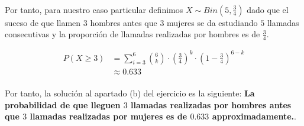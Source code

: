 \documentclass[a4paper, spanish]{article}
\begin{document}
    \paragraph{}
    Por tanto, para nuestro caso particular definimos $X \sim Bin\left(5, \frac{3}{4}\right)$ dado que el suceso de que llamen $3$ hombres antes que $3$ mujeres se da estudiando $5$ llamadas consecutivas y la proporción de llamadas realizadas por hombres es de $\frac{3}{4}$.

    \begin{align*}
      P(X \geq 3)
      &= \sum_{i = 3}^6 \binom{6}{k} \cdot \left(\frac{3}{4} \right)^k \cdot \left(1 - \frac{3}{4}\right) ^ {6 - k} \\
      &\approx 0.633
    \end{align*}

    \paragraph{}
    Por tanto, la solución al apartado (b) del ejercicio es la siguiente: \textbf{La probabilidad de que lleguen $3$ llamadas realizadas por hombres antes que $3$ llamadas realizadas por mujeres es de $0.633$ approximadamente.}.
\end{document}
